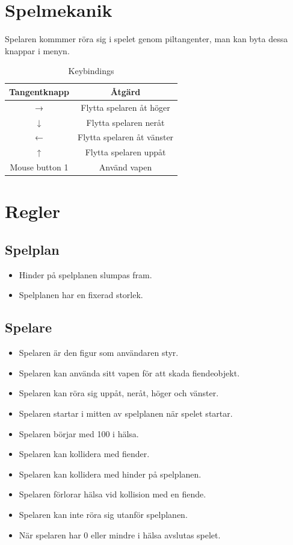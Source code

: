 \documentclass{TDP005mall}
\begin{document}
  \section{Spelmekanik}
  Spelaren kommmer röra sig i spelet genom piltangenter, man kan byta dessa knappar i menyn.
  \begin{table}[H]
    \begin{center}
      \begin{tabular}{ |c|c| }
        \hline
        \textbf{Tangentknapp} & \textbf{Åtgärd} \\
        \hline
        → & Flytta spelaren åt höger \\
        \hline
        ↓ & Flytta spelaren neråt \\
        \hline
        ← & Flytta spelaren åt vänster \\
        \hline
        ↑ & Flytta spelaren uppåt \\
        \hline
        Mouse button 1 & Använd vapen \\
        \hline
      \end{tabular}
    \end{center}
    \caption{Keybindings}
    \label{tab:movement}
  \end{table}

  \section{Regler}
  \subsection{Spelplan}
  \begin{itemize}
    \item Hinder på spelplanen slumpas fram.
    \item Spelplanen har en fixerad storlek.
  \end{itemize}

  \subsection{Spelare}
  \begin{itemize}
    \item Spelaren är den figur som användaren styr.
    \item Spelaren kan använda sitt vapen för att skada fiendeobjekt.
    \item Spelaren kan röra sig uppåt, neråt, höger och vänster.
    \item Spelaren startar i mitten av spelplanen när spelet startar.
    \item Spelaren börjar med 100 i hälsa.
    \item Spelaren kan kollidera med fiender.
    \item Spelaren kan kollidera med hinder på spelplanen.
    \item Spelaren förlorar hälsa vid kollision med en fiende.
    \item Spelaren kan inte röra sig utanför spelplanen.
    \item När spelaren har 0 eller mindre i hälsa avslutas spelet.
  \end{itemize}
\end{document}
